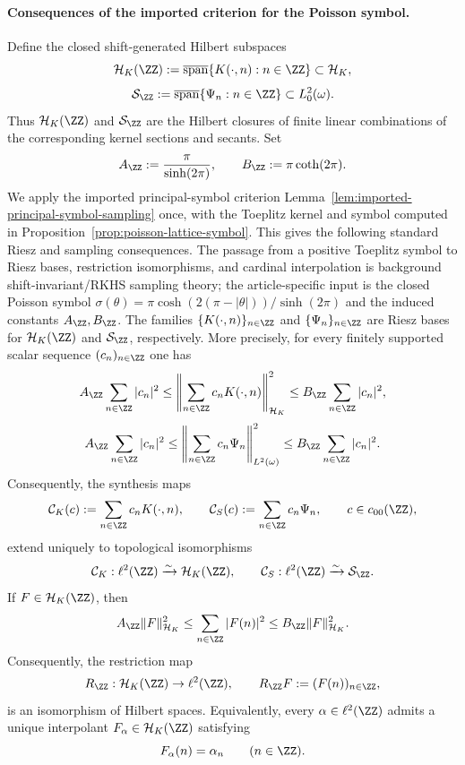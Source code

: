 \paragraph{Consequences of the imported criterion for the Poisson symbol.}
Define the closed shift-generated Hilbert subspaces
\[
\mathcal H_K(\ZZ)
:=
\overline{\operatorname{span}}\{K(\cdot,n):n\in\ZZ\}
\subset \mathcal H_K,
\]
\[
\mathcal S_{\ZZ}
:=
\overline{\operatorname{span}}\{\Psi_n:n\in\ZZ\}
\subset L^2_0(\omega).
\]
Thus $\mathcal H_K(\ZZ)$ and $\mathcal S_{\ZZ}$ are the Hilbert closures
of finite linear combinations of the corresponding kernel sections and
secants.
Set
\begin{equation}\label{eq:lattice-sampling-constants}
A_{\ZZ}:=\frac{\pi}{\sinh(2\pi)},
\qquad
B_{\ZZ}:=\pi\coth(2\pi).
\end{equation}
We apply the imported principal-symbol criterion
Lemma~\ref{lem:imported-principal-symbol-sampling} once, with the Toeplitz
kernel and symbol computed in
Proposition~\ref{prop:poisson-lattice-symbol}.  This gives the following
standard Riesz and sampling consequences.  The passage from a positive
Toeplitz symbol to Riesz bases, restriction isomorphisms, and cardinal
interpolation is background shift-invariant/RKHS sampling theory; the
article-specific input is the closed Poisson symbol
$\sigma(\theta)=\pi\cosh(2(\pi-|\theta|))/\sinh(2\pi)$ and the induced
constants $A_{\ZZ},B_{\ZZ}$.  The families
$\{K(\cdot,n)\}_{n\in\ZZ}$ and $\{\Psi_n\}_{n\in\ZZ}$ are Riesz bases for
$\mathcal H_K(\ZZ)$ and $\mathcal S_{\ZZ}$, respectively.  More
precisely, for every
finitely supported scalar sequence $(c_n)_{n\in\ZZ}$ one has
\begin{equation}\label{eq:lattice-riesz-kernel}
A_{\ZZ}\sum_{n\in\ZZ}|c_n|^2
\le
\left\|
\sum_{n\in\ZZ}c_nK(\cdot,n)
\right\|_{\mathcal H_K}^2
\le
B_{\ZZ}\sum_{n\in\ZZ}|c_n|^2,
\end{equation}
\begin{equation}\label{eq:lattice-riesz-secant}
A_{\ZZ}\sum_{n\in\ZZ}|c_n|^2
\le
\left\|
\sum_{n\in\ZZ}c_n\Psi_n
\right\|_{L^2(\omega)}^2
\le
B_{\ZZ}\sum_{n\in\ZZ}|c_n|^2.
\end{equation}
Consequently, the synthesis maps
\[
\mathcal C_K(c):=\sum_{n\in\ZZ}c_nK(\cdot,n),
\qquad
\mathcal C_S(c):=\sum_{n\in\ZZ}c_n\Psi_n,
\qquad c\in c_{00}(\ZZ),
\]
extend uniquely to topological isomorphisms
\[
\mathcal C_K:\ell^2(\ZZ)\xrightarrow{\sim}\mathcal H_K(\ZZ),
\qquad
\mathcal C_S:\ell^2(\ZZ)\xrightarrow{\sim}\mathcal S_{\ZZ}.
\]
If $F\in\mathcal H_K(\ZZ)$, then
\begin{equation}\label{eq:lattice-sampling-HK}
A_{\ZZ}\|F\|_{\mathcal H_K}^2
\le
\sum_{n\in\ZZ}|F(n)|^2
\le
B_{\ZZ}\|F\|_{\mathcal H_K}^2.
\end{equation}
Consequently, the restriction map
\[
R_{\ZZ}:\mathcal H_K(\ZZ)\to \ell^2(\ZZ),
\qquad
R_{\ZZ}F:=(F(n))_{n\in\ZZ},
\]
is an isomorphism of Hilbert spaces.  Equivalently, every
$\alpha\in\ell^2(\ZZ)$ admits a unique interpolant
$F_\alpha\in\mathcal H_K(\ZZ)$ satisfying
\[
F_\alpha(n)=\alpha_n
\qquad(n\in\ZZ).
\]


